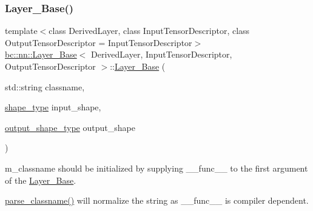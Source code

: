\subsubsection{\texorpdfstring{Layer\+\_\+\+Base()}{Layer\_Base()}\hspace{0.1cm}{\footnotesize\ttfamily [1/2]}}
{\footnotesize\ttfamily template$<$class Derived\+Layer, class Input\+Tensor\+Descriptor, class Output\+Tensor\+Descriptor = Input\+Tensor\+Descriptor$>$ \\
\hyperlink{structbc_1_1nn_1_1Layer__Base}{bc\+::nn\+::\+Layer\+\_\+\+Base}$<$ Derived\+Layer, Input\+Tensor\+Descriptor, Output\+Tensor\+Descriptor $>$\+::\hyperlink{structbc_1_1nn_1_1Layer__Base}{Layer\+\_\+\+Base} (\begin{DoxyParamCaption}\item[{std\+::string}]{classname,  }\item[{\hyperlink{structbc_1_1nn_1_1Layer__Base_ab8cbdaad20a0270b2555a91676a79932}{shape\+\_\+type}}]{input\+\_\+shape,  }\item[{\hyperlink{structbc_1_1nn_1_1Layer__Output__Base_aa627047014ee5dff2b9cc1804c791815}{output\+\_\+shape\+\_\+type}}]{output\+\_\+shape }\end{DoxyParamCaption})\hspace{0.3cm}{\ttfamily [inline]}}



m\+\_\+classname should be initialized by supplying {\ttfamily \+\_\+\+\_\+func\+\_\+\+\_\+} to the first argument of the \hyperlink{structbc_1_1nn_1_1Layer__Base}{Layer\+\_\+\+Base}. 

{\ttfamily \hyperlink{structbc_1_1nn_1_1Layer__Base_a1a046bb75106966abd0e0d02bfec7e16}{parse\+\_\+classname()}} will normalize the string as {\ttfamily \+\_\+\+\_\+func\+\_\+\+\_\+} is compiler dependent. \mbox{\label{structbc_1_1nn_1_1Layer__Base_ae44170fd034038dcd6246a8726d2e109}} 

